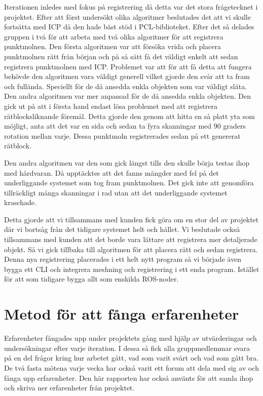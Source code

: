 Iterationen inledes med fokus på registrering då detta var det stora frågetecknet i projektet. Efter att först undersökt olika algoritmer beslutades det att vi skulle fortsätta med ICP då den hade bäst stöd i PCL-biblioteket. Efter det så delades gruppen i två för att arbeta med två olika algoritmer för att registrera punktmolnen. Den första algoritmen var att försöka vrida och placera punktmolnen rätt från början och på så sätt få det väldigt enkelt att sedan registrera punktmolnen med ICP. Problemet var att för att få detta att fungera behövde den algoritmen vara väldigt generell vilket gjorde den svår att ta fram och fullända. Speciellt för de då ansedda enkla objekten som var väldigt släta. Den andra algoritmen var mer anpassad för de då ansedda enkla objekten. Den gick ut på att i första hand endast lösa problemet med att registrera rätblocksliknande föremål. Detta gjorde den genom att hitta en så platt yta som möjligt, anta att det var en sida och sedan ta fyra skanningar med 90 graders rotation mellan varje. Dessa punktmoln registrerades sedan på ett genererat rätblock. 

Den andra algoritmen var den som gick längst tills den skulle börja testas ihop med hårdvaran. Då upptäcktes att det fanns mängder med fel på det underliggande systemet som tog fram punktmolnen. Det gick inte att genomföra tillräckligt många skanningar i rad utan att det underliggande systemet kraschade. 

Detta gjorde att vi tillsammans med kunden fick göra om en stor del av projektet där vi bortsåg från det tidigare systemet helt och hållet. Vi beslutade också tillsammans med kunden att det borde vara lättare att registrera mer detaljerade objekt. Så vi gick tillbaka till algoritmen för att placera rätt och sedan registrera. Denna nya registrering placerades i ett helt nytt program så vi började även bygga ett CLI och integrera meshning och registrering i ett enda program. Istället för att som tidigare bygga allt som enskilda ROS-noder. 

\section{Metod för att fånga erfarenheter}

Erfarenheter fångades upp under projektets gång med hjälp av utvärderingar och undersökningar efter varje iteration. I dessa så fick alla gruppmedlemmar svara på en del frågor kring hur arbetet gått, vad som varit svårt och vad som gått bra. De två fasta mötena varje vecka har också varit ett forum att dela med sig av och fånga upp erfarenheter. Den här rapporten har också använts för att samla ihop och skriva ner erfarenheter från projektet. 


